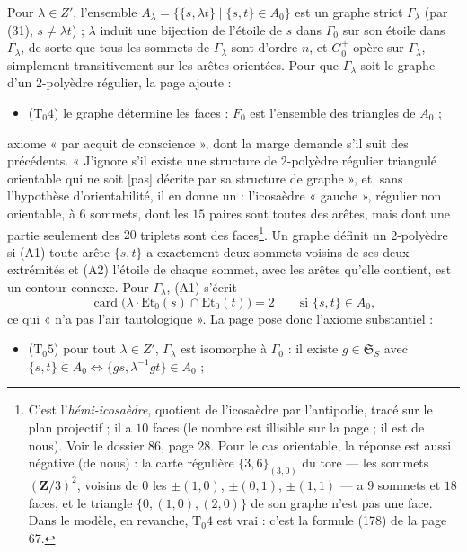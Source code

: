 \documentclass[11pt,a4paper]{article}
\begin{document}
Pour $\lambda \in Z'$, l'ensemble $A_\lambda = \{\{s, \lambda t\} \mid \{s, t\}
\in A_0\}$ est un graphe strict $\Gamma_\lambda$ (par (31), $s \neq \lambda
t$) ; $\lambda$ induit une bijection de l'étoile de $s$ dans $\Gamma_0$ sur
son étoile dans $\Gamma_\lambda$, de sorte que tous les sommets de
$\Gamma_\lambda$ sont d'ordre $n$, et $G_0^{+}$ opère sur $\Gamma_\lambda$,
simplement transitivement sur les arêtes orientées. Pour que $\Gamma_\lambda$
soit le graphe d'un 2-polyèdre régulier, la page ajoute :
\begin{itemize}
  \item ($\mathrm{T}_0 4$) le graphe détermine les faces : $F_0$ est l'ensemble
    des triangles de $A_0$ ;
\end{itemize}
axiome « par acquit de conscience », dont la marge demande s'il suit des
précédents. « J'ignore s'il existe une structure de 2-polyèdre régulier
triangulé orientable qui ne soit [pas] décrite par sa structure de graphe »,
et, sans l'hypothèse d'orientabilité, il en donne un : l'icosaèdre « gauche »,
régulier non orientable, à $6$ sommets, dont les $15$ paires sont toutes des
arêtes, mais dont une partie seulement des $20$ triplets sont des
faces\footnote{C'est l'\emph{hémi-icosaèdre}, quotient de l'icosaèdre par
l'antipodie, tracé sur le plan projectif ; il a $10$ faces (le nombre est
illisible sur la page ; il est de nous). Voir le dossier 86, page 28. Pour le
cas orientable, la réponse est aussi négative (de nous) : la carte régulière
$\{3, 6\}_{(3,0)}$ du tore --- les sommets $(\mathbf{Z}/3)^2$, voisins de $0$
les $\pm(1,0)$, $\pm(0,1)$, $\pm(1,1)$ --- a $9$ sommets et $18$ faces, et le
triangle $\{0, (1,0), (2,0)\}$ de son graphe n'est pas une face. Dans le modèle,
en revanche, $\mathrm{T}_0 4$ est vrai : c'est la formule (178) de la page 67.}.
Un graphe définit un 2-polyèdre si (A1) toute arête $\{s, t\}$ a exactement
deux sommets voisins de ses deux extrémités et (A2) l'étoile de chaque sommet,
avec les arêtes qu'elle contient, est un contour connexe. Pour $\Gamma_\lambda$,
(A1) s'écrit
\[
  \operatorname{card}\bigl(\lambda \cdot \mathrm{Et}_0(s) \cap \mathrm{Et}_0(t)\bigr)
  = 2 \qquad \text{si } \{s, t\} \in A_0 ,
\]
ce qui « n'a pas l'air tautologique ». La page pose donc l'axiome substantiel :
\begin{itemize}
  \item ($\mathrm{T}_0 5$) pour tout $\lambda \in Z'$, $\Gamma_\lambda$ est
    isomorphe à $\Gamma_0$ : il existe $g \in \mathfrak{S}_S$ avec $\{s, t\}
    \in A_0 \iff \{gs, \lambda^{-1} gt\} \in A_0$ ;
\end{itemize}
\end{document}
